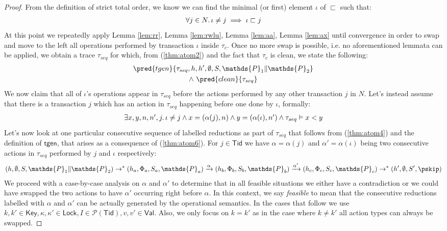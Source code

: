 \begin{thm}
{\begin{proof}
From the definition of strict total order, we know we can find the minimal (or first) element $\iota$ of $\sqsubset$ such that:
\begin{gather}
	\label{thm:atom3} \forall j \in N \ldotp \iota \neq j \implies \iota \sqsubset j
\end{gather}
At this point we repeatedly apply Lemma \ref{lem:rr}, Lemma \ref{lem:rwlu}, Lemma \ref{lem:aa}, Lemma \ref{lem:ax} until convergence in order to swap and move to the left all operations performed by transaction $\iota$ inside $\tau_c$. Once no more swap is possible, i.e. no aforementioned lemmata can be applied, we obtain a trace $\tau_{seq}$ for which, from (\ref{thm:atom2}) and the fact that $\tau_c$ is clean, we state the following:
\begin{gather}
	\label{thm:atom4} \pred{tgen}{\tau_{seq}, h, h', \emptyset, S, \mathds{P}_1 \| \mathds{P}_2} \\
		\land\
	\label{thm:atom7} \pred{clean}{\tau_{seq}}
\end{gather}
We now claim that all of $\iota$'s operations appear in $\tau_{seq}$ before the actions performed by any other transaction $j$ in $N$. Let's instead assume that there is a transaction $j$ which has an action in $\tau_{seq}$ happening before one done by $\iota$, formally:
\begin{gather}
	\label{thm:atom6}
	\begin{array}{c}
		\exists x, y, n, n', j \ldotp
		\iota \neq j
		\land x = (\alpha(j), n)
		\land y = (\alpha(\iota), n')
		\land \tau_{seq} \vDash x < y
	\end{array}
\end{gather}
Let's now look at one particular consecutive sequence of labelled reductions as part of $\tau_{seq}$ that follows from (\ref{thm:atom4}) and the definition of $\mathsf{tgen}$, that arises as a consequence of (\ref{thm:atom6}). For $j \in \mathsf{Tid}$ we have $\alpha = \alpha(j)$ and $\alpha' = \alpha(\iota)$ being two consecutive actions in $\tau_{seq}$ performed by $j$ and $\iota$ respectively: %
\begin{gather*}
	(h, \emptyset, S, \mathds{P}_1 \| \mathds{P}_2)
		\rightarrow^*
	(h_a, \Phi_a, S_a, \mathds{P}_a)
		\xrightarrow{\alpha}
	(h_b, \Phi_b, S_b, \mathds{P}_b)
		\xrightarrow{\alpha'}
	(h_c, \Phi_c, S_c, \mathds{P}_c)
		\rightarrow^*
	(h', \emptyset, S', \pskip)
\end{gather*}
We proceed with a case-by-case analysis on $\alpha$ and $\alpha'$ to determine that in all feasible situations we either have a contradiction or we could have swapped the two actions to have $\alpha'$ occurring right before $\alpha$. In this context, we say \textit{feasible} to mean that the consecutive reductions labelled with $\alpha$ and $\alpha'$ can be actually generated by the operational semantics. In the cases that follow we use $k, k' \in \mathsf{Key}, \kappa, \kappa' \in \mathsf{Lock}, I \in \mathcal{P}(\mathsf{Tid}), v, v' \in \mathsf{Val}$. Also, we only focus on $k = k'$ as in the case where $k \neq k'$ all action types can always be swapped.

\end{proof}}
\end{thm}
